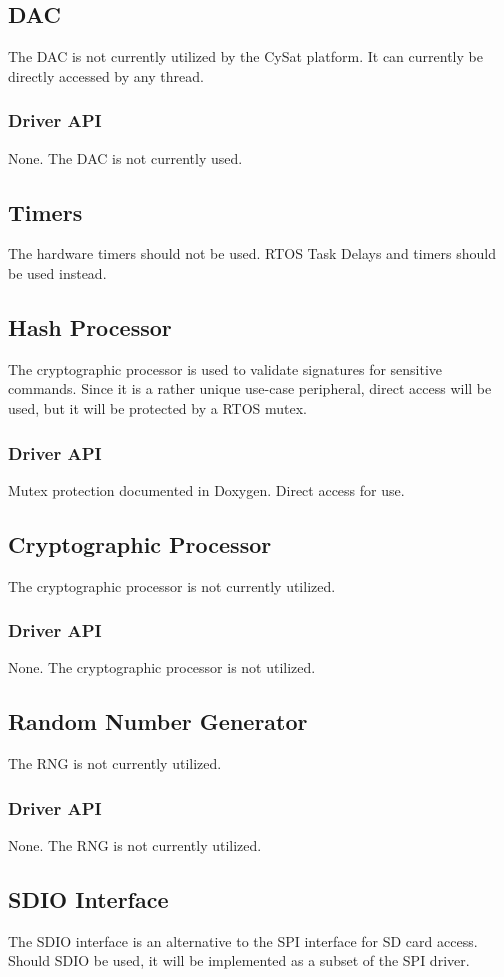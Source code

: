 \documentclass{article}
\begin{document}
\subsection{DAC}
The DAC is not currently utilized by the CySat platform. It can currently
be directly accessed by any thread.
\subsubsection{Driver API}
None. The DAC is not currently used.

\subsection{Timers}
The hardware timers should not be used. RTOS Task Delays and timers should be used instead.

\subsection{Hash Processor}
The cryptographic processor is used to validate signatures for sensitive commands. Since it
is a rather unique use-case peripheral, direct access will be used, but it will be
protected by a RTOS mutex.
\subsubsection{Driver API}
Mutex protection documented in Doxygen. Direct access for use.

\subsection{Cryptographic Processor}
The cryptographic processor is not currently utilized.
\subsubsection{Driver API}
None. The cryptographic processor is not utilized.

\subsection{Random Number Generator}
The RNG is not currently utilized.
\subsubsection{Driver API}
None. The RNG is not currently utilized.

\subsection{SDIO Interface}
The SDIO interface is an alternative to the SPI interface for SD card access.
Should SDIO be used, it will be implemented as a subset of the SPI driver.
\end{document}
